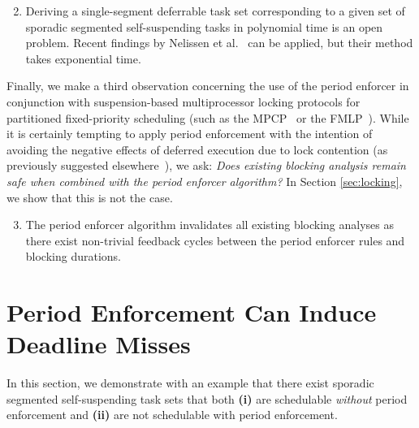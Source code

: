 \begin{enumerate}
\setcounter{enumi}{1}
	\item Deriving a single-segment deferrable task set corresponding to a given set of sporadic segmented self-suspending tasks in polynomial time is an open problem. Recent findings by Nelissen et al.~\cite{ecrts15nelissen} can be applied, but their method takes exponential time.
\end{enumerate}

Finally, we make a third observation concerning the use of the period enforcer in conjunction with suspension-based multiprocessor locking protocols for partitioned fixed-priority scheduling (such as the MPCP~\cite{LNR:09,Ra:90} or the FMLP~\cite{BLBA:07,BA:08}). While it is certainly tempting to apply period enforcement with the intention of avoiding the negative effects of deferred execution due to lock contention (as previously suggested elsewhere~\cite{Raj:91,Lak:11,LNR:09}), we ask: \emph{Does existing blocking analysis remain safe when combined with the period enforcer algorithm?} In Section \ref{sec:locking}, we show that this is not the case.
\begin{enumerate}
\setcounter{enumi}{2}
	\item The period enforcer algorithm invalidates all existing blocking analyses as there exist non-trivial feedback cycles between the period enforcer rules and blocking durations.
\end{enumerate}



\section{Period Enforcement Can Induce Deadline Misses}
\label{sec:unschedulable}

In this section, we demonstrate with an example that there exist sporadic  segmented self-suspending task sets that both \textbf{(i)} are schedulable \emph{without} period enforcement and \textbf{(ii)} are not schedulable with period enforcement.

